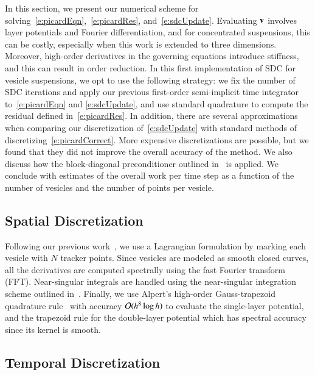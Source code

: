 In this section, we present our numerical scheme for
solving~\eqref{e:picardEqn},~\eqref{e:picardRes},
and~\eqref{e:sdcUpdate}.  Evaluating ${\mathbf{v}}$ involves layer potentials
and Fourier differentiation, and for concentrated suspensions, this can
be costly, especially when this work is extended to three dimensions.
Moreover, high-order derivatives in the governing equations introduce
stiffness, and this can result in order reduction.  In this first
implementation of SDC for vesicle suspensions, we opt to use the
following strategy: we fix the number of SDC iterations and apply our
previous first-order semi-implicit time integrator~\cite{qua:bir2014b}
to~\eqref{e:picardEqn} and \eqref{e:sdcUpdate}, and use standard
quadrature to compute the residual defined in~\eqref{e:picardRes}.  In
addition, there are several approximations when comparing our
discretization of~\eqref{e:sdcUpdate} with standard methods of
discretizing~\eqref{e:picardCorrect}.  More expensive discretizations
are possible, but we found that they did not improve the overall
accuracy of the method.  We also discuss how the block-diagonal
preconditioner outlined in~\cite{qua:bir2014b} is applied.  We conclude
with estimates of the overall work per time step as a function of the
number of vesicles and the number of points per vesicle.

\subsection{Spatial Discretization}

Following our previous
work~\cite{qua:bir2014b,rah:vee:bir2010,vee:gue:zor:bir2009}, we use a
Lagrangian formulation by marking each vesicle with $N$ tracker
points.  Since vesicles are modeled as smooth closed curves, all the
derivatives are computed spectrally using the fast Fourier transform
(FFT).  Near-singular integrals are handled using the near-singular
integration scheme outlined in~\cite{qua:bir2014b}.  Finally, we use
Alpert's high-order Gauss-trapezoid quadrature rule~\cite{alp1999} with
accuracy $\mathcal{O}(h^{8} \log h)$ to evaluate the single-layer potential,
and the trapezoid rule for the double-layer potential which has
spectral accuracy since its kernel is smooth.

\subsection{Temporal Discretization}

